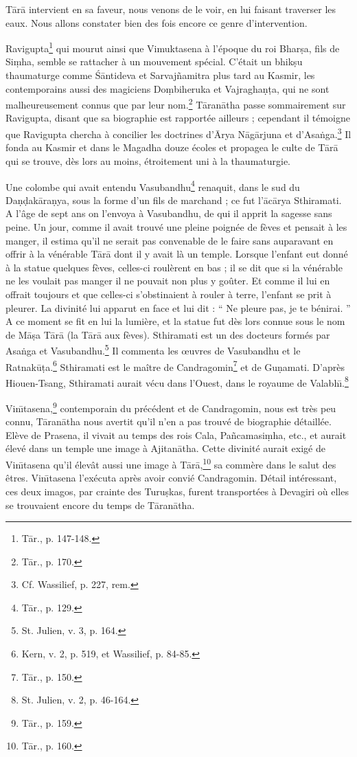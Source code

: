 \documentclass[a4paper, 11pt, oneside, french]{article}
\begin{document}
T\={a}r\={a} intervient en sa faveur, nous venons de le voir, en lui faisant traverser les eaux. Nous allons constater bien des fois encore ce genre d'intervention.

Ravigupta\footnote{T\={a}r., p. 147-148.} qui mourut ainsi que Vimuktasena à l'époque du roi Bhar\d{s}a, fils de Si\d{m}ha, semble se rattacher à un mouvement spécial. C'était un bhik\d{s}u thaumaturge comme \'{S}\={a}ntideva et Sarvaj\~{n}amitra plus tard au Kasmir, les contemporains aussi des magiciens Do\d{m}biheruka et Vajragha\d{n}\d{t}a, qui ne sont malheureusement connus que par leur nom.\footnote{T\={a}r., p. 170.} T\={a}ran\={a}tha passe sommairement sur Ravigupta, disant que sa biographie est rapportée ailleurs ; cependant il témoigne que Ravigupta chercha à concilier les doctrines d'\={A}rya N\={a}g\={a}rjuna et d'Asa\.{n}ga.\footnote{Cf. Wassilief, p. 227, rem.} Il fonda au Kasmir et dans le Magadha douze écoles et propagea le culte de T\={a}r\={a} qui se trouve, dès lors au moins, étroitement uni à la thaumaturgie.

Une colombe qui avait entendu Vasubandhu\footnote{T\={a}r., p. 129.} renaquit, dans le sud du Da\d{n}\d{d}ak\={a}ra\d{n}ya, sous la forme d'un fils de marchand ; ce fut l'\={a}c\={a}rya Sthiramati. A l'âge de sept ans on l'envoya à Vasubandhu, de qui il apprit la sagesse sans peine. Un jour, comme il avait trouvé une pleine poignée de fèves et pensait à les manger, il estima qu'il ne serait pas convenable de le faire sans auparavant en offrir à la vénérable T\={a}r\={a} dont il y avait là un temple. Lorsque l'enfant eut donné à la statue quelques fèves, celles-ci roulèrent en bas ; il se dit que si la vénérable ne les voulait pas manger il ne pouvait non plus y goûter. Et comme il lui en offrait toujours et que celles-ci s'obstinaient à rouler à terre, l'enfant se prit à pleurer. La divinité lui apparut en face et lui dit : `` Ne pleure pas, je te bénirai. '' A ce moment se fit en lui la lumière, et la statue fut dès lors connue sous le nom de M\={a}\d{s}a T\={a}r\={a} (la T\={a}r\={a} aux fèves). Sthiramati est un des docteurs formés par Asa\.{n}ga et Vasubandhu.\footnote{St. Julien, v. 3, p. 164.} Il commenta les œuvres de Vasubandhu et le Ratnak\={u}\d{t}a.\footnote{Kern, v. 2, p. 519, et Wassilief, p. 84-85.} Sthiramati est le maître de Candragomin\footnote{T\={a}r., p. 150.} et de Gu\d{n}amati. D'après Hiouen-Tsang, Sthiramati aurait vécu dans l'Ouest, dans le royaume de Valabh\={\i}.\footnote{St. Julien, v. 2, p. 46-164.}

Vin\={\i}tasena,\footnote{T\={a}r., p. 159.} contemporain du précédent et de Candragomin, nous est très peu connu, T\={a}ran\={a}tha nous avertit qu'il n'en a pas trouvé de biographie détaillée. Elève de Prasena, il vivait au temps des rois Cala, Pa\~{n}camasi\d{m}ha, etc., et aurait élevé dans un temple une image à Ajitan\={a}tha. Cette divinité aurait exigé de Vin\={\i}tasena qu'il élevât aussi une image à T\={a}r\={a},\footnote{T\={a}r., p. 160.} sa commère dans le salut des êtres. Vin\={\i}tasena l'exécuta après avoir convié Candragomin. Détail intéressant, ces deux imagos, par crainte des Turu\d{s}kas, furent transportées à Devagiri où elles se trouvaient encore du temps de T\={a}ran\={a}tha.
\end{document}
